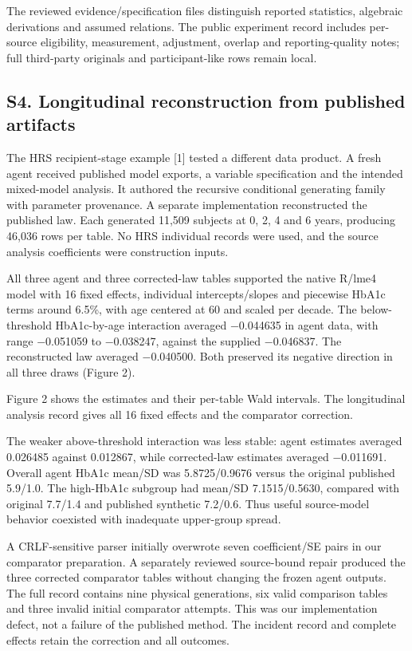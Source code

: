 \documentclass[sigconf,anonymous,review]{acmart}
\begin{document}
The reviewed evidence/\allowbreak{}specification files distinguish reported statistics, algebraic derivations and assumed relations. The public experiment record includes per-source eligibility, measurement, adjustment, overlap and reporting-quality notes; full third-party originals and participant-like rows remain local.


\subsection*{S4. Longitudinal reconstruction from published artifacts}

The HRS recipient-stage example [1] tested a different data product. A fresh agent received published model exports, a variable specification and the intended mixed-model analysis. It authored the recursive conditional generating family with parameter provenance. A separate implementation reconstructed the published law. Each generated 11,509 subjects at 0, 2, 4 and 6 years, producing 46,036 rows per table. No HRS individual records were used, and the source analysis coefficients were construction inputs.


All three agent and three corrected-law tables supported the native R/\allowbreak{}lme4 model with 16 fixed effects, individual intercepts/\allowbreak{}slopes and piecewise HbA1c terms around 6.5\%, with age centered at 60 and scaled per decade. The below-threshold HbA1c-by-age interaction averaged −0.044635 in agent data, with range −0.051059 to −0.038247, against the supplied −0.046837. The reconstructed law averaged −0.040500. Both preserved its negative direction in all three draws (Figure 2).


Figure 2 shows the estimates and their per-table Wald intervals. The longitudinal analysis record gives all 16 fixed effects and the comparator correction.


The weaker above-threshold interaction was less stable: agent estimates averaged 0.026485 against 0.012867, while corrected-law estimates averaged −0.011691. Overall agent HbA1c mean/\allowbreak{}SD was 5.8725/\allowbreak{}0.9676 versus the original published 5.9/\allowbreak{}1.0. The high-HbA1c subgroup had mean/\allowbreak{}SD 7.1515/\allowbreak{}0.5630, compared with original 7.7/\allowbreak{}1.4 and published synthetic 7.2/\allowbreak{}0.6. Thus useful source-model behavior coexisted with inadequate upper-group spread.


A CRLF-sensitive parser initially overwrote seven coefficient/\allowbreak{}SE pairs in our comparator preparation. A separately reviewed source-bound repair produced the three corrected comparator tables without changing the frozen agent outputs. The full record contains nine physical generations, six valid comparison tables and three invalid initial comparator attempts. This was our implementation defect, not a failure of the published method. The incident record and complete effects retain the correction and all outcomes.
\end{document}
